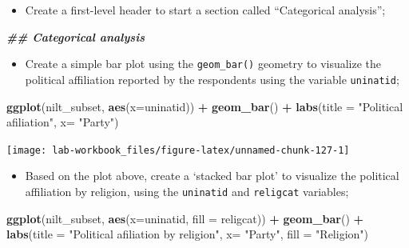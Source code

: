 \documentclass[
]{book}
\newenvironment{Shaded}{\begin{snugshade}}{\end{snugshade}}
\newcommand{\AttributeTok}[1]{\textcolor[rgb]{0.13,0.29,0.53}{#1}}
\newcommand{\DocumentationTok}[1]{\textcolor[rgb]{0.56,0.35,0.01}{\textbf{\textit{#1}}}}
\newcommand{\FunctionTok}[1]{\textcolor[rgb]{0.13,0.29,0.53}{\textbf{#1}}}
\newcommand{\NormalTok}[1]{#1}
\newcommand{\SpecialCharTok}[1]{\textcolor[rgb]{0.81,0.36,0.00}{\textbf{#1}}}
\newcommand{\StringTok}[1]{\textcolor[rgb]{0.31,0.60,0.02}{#1}}
\providecommand{\tightlist}{%
  \setlength{\itemsep}{0pt}\setlength{\parskip}{0pt}}
\begin{document}
\begin{itemize}
\tightlist
\item
  Create a first-level header to start a section called ``Categorical analysis'';
\end{itemize}

\begin{Shaded}
\begin{Highlighting}[]
\DocumentationTok{\#\# Categorical analysis}
\end{Highlighting}
\end{Shaded}

\begin{itemize}
\tightlist
\item
  Create a simple bar plot using the \texttt{geom\_bar()} geometry to visualize the political affiliation reported by the respondents using the variable \texttt{uninatid};
\end{itemize}

\begin{Shaded}
\begin{Highlighting}[]
\FunctionTok{ggplot}\NormalTok{(nilt\_subset, }\FunctionTok{aes}\NormalTok{(}\AttributeTok{x=}\NormalTok{uninatid)) }\SpecialCharTok{+}
  \FunctionTok{geom\_bar}\NormalTok{() }\SpecialCharTok{+}
  \FunctionTok{labs}\NormalTok{(}\AttributeTok{title =} \StringTok{"Political afiliation"}\NormalTok{, }\AttributeTok{x=} \StringTok{"Party"}\NormalTok{)}
\end{Highlighting}
\end{Shaded}

\begin{flushleft}\texttt{[image: lab-workbook\_files/figure-latex/unnamed-chunk-127-1]} \end{flushleft}

\begin{itemize}
\tightlist
\item
  Based on the plot above, create a `stacked bar plot' to visualize the political affiliation by religion, using the \texttt{uninatid} and \texttt{religcat} variables;
\end{itemize}

\begin{Shaded}
\begin{Highlighting}[]
\FunctionTok{ggplot}\NormalTok{(nilt\_subset, }\FunctionTok{aes}\NormalTok{(}\AttributeTok{x=}\NormalTok{uninatid, }\AttributeTok{fill =}\NormalTok{ religcat)) }\SpecialCharTok{+}
  \FunctionTok{geom\_bar}\NormalTok{() }\SpecialCharTok{+}
  \FunctionTok{labs}\NormalTok{(}\AttributeTok{title =} \StringTok{"Political afiliation by religion"}\NormalTok{, }
       \AttributeTok{x=} \StringTok{"Party"}\NormalTok{, }\AttributeTok{fill =} \StringTok{"Religion"}\NormalTok{)}
\end{Highlighting}
\end{Shaded}
\end{document}
